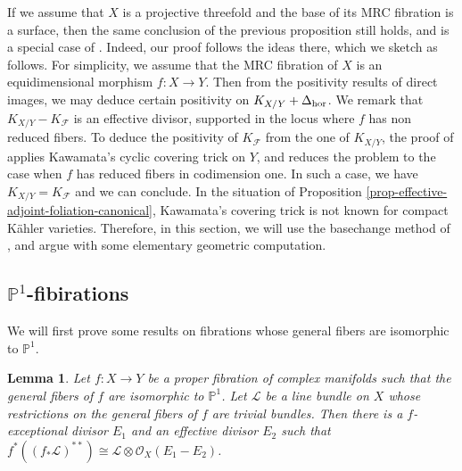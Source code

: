 \documentclass[12pt]{amsart}
\def\mbP{\mathbb{P}}
\newcommand{\<}{\leq}
\def\mcO{\mathcal{O}}
\def\mcF{\mathcal{F}}
\def\mcL{\mathcal{L}}
\newtheorem{lemma}[theorem]{Lemma}
\theoremstyle{remark}
\theoremstyle{definition}
\theoremstyle{definition}
\numberwithin{equation}{section}
\theoremstyle{definition}
\theoremstyle{definition}
\begin{document}
If we assume that  $X$ is a projective threefold and the base of its MRC fibration is a surface, then the same conclusion of the previous proposition still holds, and is  a special case of \cite[Proposition  4.1]{Dru17}. 
Indeed, our proof follows the ideas there, which we sketch as follows.  
{
For simplicity, we assume that the MRC fibration of $X$ is an equidimensional morphism $f\colon X \to Y$. 
Then from the positivity results of direct images, we may deduce certain positivity on $K_{X/Y}+\Delta_{\rm hor}$. 
We remark that  $K_{X/Y}-K_{\mcF}$ is an effective divisor, supported in the locus where $f$ has non reduced fibers. 
To deduce the positivity of $K_{\mcF}$ from the one of $K_{X/Y}$, the proof of \cite[Proposition  4.1]{Dru17} applies 
Kawamata's cyclic covering trick on $Y$, and reduces the problem to the case when $f$ has reduced fibers in codimension one. 
In such a case, we have $K_{X/Y}=K_{\mcF}$  and we can  conclude.  
In the situation of Proposition \ref{prop-effective-adjoint-foliation-canonical}, Kawamata's  covering trick is not known for compact K\"ahler varieties. 
Therefore, in this section,  we will use the basechange method of \cite[Lemma 9.11]{DasOu2022}, and argue with some elementary geometric computation. 
}



\subsection{$\mathbb{P}^1$-fibirations}
We will first prove some   results on fibrations whose general fibers are isomorphic to $\mathbb{P}^1$.

\begin{lemma}\label{lem:reflexive-pushforward}
	 Let $f:X\to Y$ be a proper fibration of complex manifolds such that the general fibers of $f$ are isomorphic to $\mbP^1$. 
  Let $\mcL$ be a line bundle on $X$ whose restrictions on   the general fibers of $f$ are  trivial bundles. 
	Then there is a $f$-exceptional divisor $E_1$ and an effective divisor $E_2$ such that $f^*((f_*\mcL)^{**})\cong \mcL \otimes \mcO_X(E_1-E_2)$.
\end{lemma}
\end{document}
